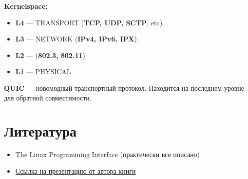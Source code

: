 \documentclass[../../lectures.tex]{subfiles}
\begin{document}
\textbf{Kernelspace:}
\begin{itemize}
    \item \textbf{L4} --- TRANSPORT (\textbf{TCP, UDP, SCTP}, etc)
    \item \textbf{L3} --- NETWORK (\textbf{IPv4, IPv6, IPX})
    \item \textbf{L2} ---  (\textbf{802.3, 802.11})
    \item \textbf{L1} --- PHYSICAL
\end{itemize}

\textbf{QUIC} --- новомодный транспортный протокол. Находится на последнем уровне для обратной совместимости.

\newpage
\section{Литература}
\begin{itemize}
    \item The Linux Programming Interface (практически все описано)
    \item \textcolor{blue}{
        \href{http://man7.org/conf/lca2013/IPC_Overview-LCA-2013-printable.pdf}{Ссылка на презентацию от автора книги}
    }
\end{itemize}
\end{document}
